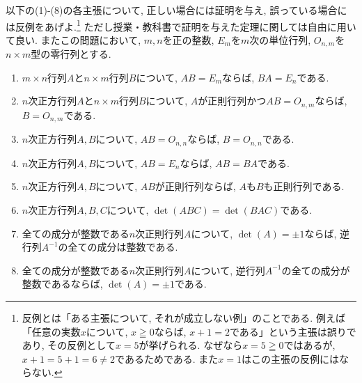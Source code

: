 \documentclass[dvipdfmx,a4paper,11pt]{article}
\theoremstyle{definition}
\begin{document}
   以下の(1)-(8)の各主張について, 正しい場合には証明を与え, 誤っている場合には反例をあげよ.\footnote{反例とは「ある主張について, それが成立しない例」のことである. 例えば「任意の実数$x$について, $x \geqq 0$ならば, $x+1=2$である」という主張は誤りであり, その反例として$x=5$が挙げられる. なぜなら$x=5 \geqq0$ではあるが, $x+1 = 5 + 1 =6 \neq 2$であるためである. また$x=1$はこの主張の反例にはならない.}
   ただし授業・教科書で証明を与えた定理に関しては自由に用いて良い. またこの問題において, $m,n$を正の整数, $E_m$を$m$次の単位行列, $O_{n,m}$を$n\times m$型の零行列とする.
 \begin{enumerate}
\renewcommand{\labelenumi}{(\arabic{enumi}).}
 \setlength{\parskip}{0cm} %
  \setlength{\itemsep}{0cm}
 \item $m\times n$行列$A$と$n\times m$行列$B$について, $AB=E_m$ならば, $BA = E_n$である.
 \item $n$次正方行列$A$と$n\times m$行列$B$について, $A$が正則行列かつ$AB=O_{n,m}$ならば, $B=O_{n,m}$である.
  \item $n$次正方行列$A, B$について, $AB=O_{n,n}$ならば, $B=O_{n,n}$である.
  \item $n$次正方行列$A, B$について, $AB=E_n$ならば, $AB=BA$である.
   \item $n$次正方行列$A, B$について, $AB$が正則行列ならば, $A$も$B$も正則行列である.
 \item $n$次正方行列$A, B, C$について, $\det(ABC) = \det(BAC)$である.
 \item 全ての成分が整数である$n$次正則行列$A$について, $\det(A) =\pm1$ならば, 逆行列$A^{-1}$の全ての成分は整数である.
 \item 全ての成分が整数である$n$次正則行列$A$について, 逆行列$A^{-1}$の全ての成分が整数であるならば, $\det(A) =\pm1$である.

 \end{enumerate} 
 \vspace{11pt}
 
\hspace{-11pt}{\Large $\bullet$ 第4問解答例.}
\end{document}
